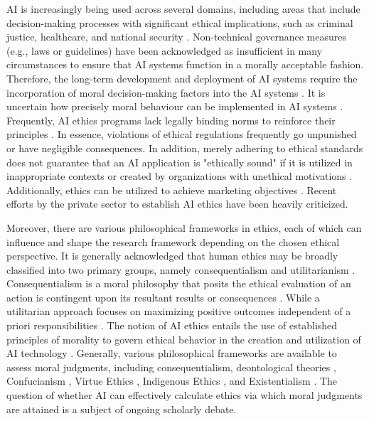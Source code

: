 \documentclass[sigconf]{acmart}
\begin{document}
AI is increasingly being used across several domains, including areas that include decision-making processes with significant ethical implications, such as criminal justice, healthcare, and national security \cite{tolmeijer2022capable}. Non-technical governance measures (e.g., laws or guidelines) have been acknowledged as insufficient in many circumstances to ensure that AI systems function in a morally acceptable fashion. Therefore, the long-term development and deployment of AI systems require the incorporation of moral decision-making factors into the AI systems \cite{Salo2021AI}. It is uncertain how precisely moral behaviour can be implemented in AI systems \cite{LaCroix2019Learning}.  Frequently, AI ethics programs lack legally binding norms to reinforce their principles \cite{Resseguier2020ethics}. In essence, violations of ethical regulations frequently go unpunished or have negligible consequences. In addition, merely adhering to ethical standards does not guarantee that an AI application is "ethically sound" if it is utilized in inappropriate contexts or created by organizations with unethical motivations \cite{Lauer2020cannot}. Additionally, ethics can be utilized to achieve marketing objectives \cite{Floridi2019Translating}. Recent efforts by the private sector to establish AI ethics have been heavily criticized.

Moreover, there are various philosophical frameworks in ethics, each of which can influence and shape the research framework depending on the chosen ethical perspective. It is generally acknowledged that human ethics may be broadly classified into two primary groups, namely consequentialism and utilitarianism \cite{zoshak2021beyond, goldsmith2017teaching}. Consequentialism is a moral philosophy that posits the ethical evaluation of an action is contingent upon its resultant results or consequences \cite{Samarawickrama2022AI}. While a utilitarian approach focuses on maximizing positive outcomes independent of a priori responsibilities \cite{bauer2020virtuous}. The notion of AI ethics entails the use of established principles of morality to govern ethical behavior in the creation and utilization of AI technology \cite{Leslie2019Understanding}. Generally, various philosophical frameworks are available to assess moral judgments, including consequentialism, deontological theories \cite{Moor1995Is}, Confucianism \cite{muyskens2024can}, Virtue Ethics \cite{farina2024ai}, Indigenous Ethics \cite{maitra2020artificial}, and Existentialism \cite{lagerkvist2024body}. The question of whether AI can effectively calculate ethics via which moral judgments are attained is a subject of ongoing scholarly debate.
\end{document}

